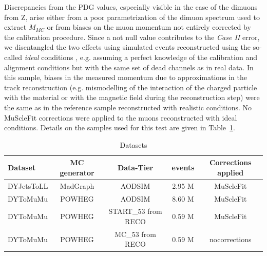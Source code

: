 Discrepancies from the PDG values, especially visible in the case of
the dimuons from Z, arise either
from a poor parametrization of the dimuon spectrum used to extract $M_{MC}$ or from biases on the muon momentum not entirely corrected by the
calibration procedure.
Since a not null value contributes 
to the {\sl Case II} error,
we disentangled the two effects using
simulated events reconstructed using the so-called {\sl ideal}
conditions , e.g. assuming a perfect knowledge of the
calibration and alignment conditions but with the same set of
dead channels as in real data.
In this sample, biases in the measured momentum due
to approximations in the track reconstruction (e.g. mismodelling
of the interaction of the charged particle
with the material or with the magnetic field during the reconstruction step) were the same as
in the reference sample reconstructed with realistic conditions. 
No MuScleFit corrections were applied to the muons reconstructed with ideal conditions.
Details on the samples used for this test are given in Table~\ref{tab:datasets_for_systematics}.
\begin{table}[hbH]
\begin{center}
\caption{Datasets \label{tab:datasets_for_systematics}} 
\begin{tabular}{|l|c|c|c|c|}
\hline
Dataset & MC generator & Data-Tier & events & Corrections applied\\
\hline 
DYJetsToLL & MadGraph &  AODSIM              & 2.95 M & MuScleFit \\
DYToMuMu   & POWHEG   &  AODSIM              & 8.60 M & MuScleFit \\
DYToMuMu   & POWHEG   &  START\_53 from RECO & 0.59 M & MuScleFit \\
DYToMuMu   & POWHEG   &  MC\_53 from RECO    & 0.59 M & nocorrections \\
\hline
\hline
\end{tabular}
\end{center}
\end{table}
